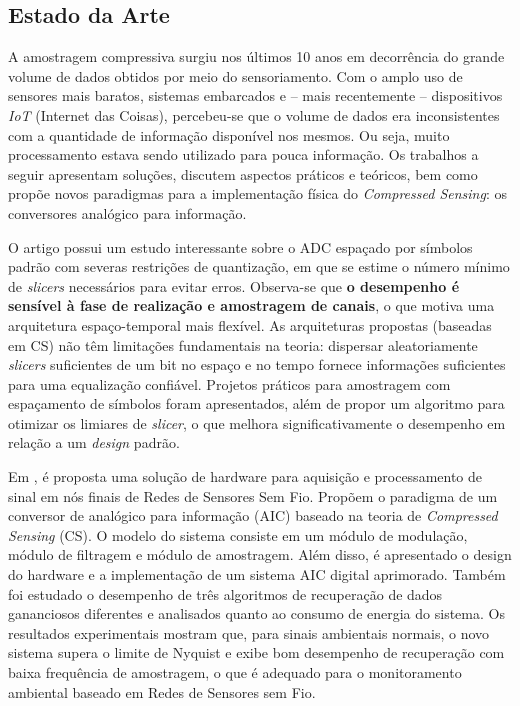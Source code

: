 \documentclass[a4paper, 12pt]{article}
\begin{document}
\subsection{Estado da Arte}

A amostragem compressiva surgiu nos últimos 10 anos em decorrência do grande volume de dados obtidos por meio do sensoriamento. Com o amplo uso de sensores mais baratos, sistemas embarcados e -- mais recentemente -- dispositivos \textit{IoT} (Internet das Coisas), percebeu-se que o volume de dados era inconsistentes com a quantidade de informação disponível nos mesmos. Ou seja, muito processamento estava sendo utilizado para pouca informação. Os trabalhos a seguir apresentam soluções, discutem aspectos práticos e teóricos, bem como propõe novos paradigmas para a implementação física do \textit{Compressed Sensing}: os conversores analógico para informação.

O artigo \cite{wadhwa2016slicer} possui um estudo interessante sobre o ADC espaçado por símbolos padrão com severas restrições de quantização, em que se estime o número mínimo de \textit{slicers} necessários para evitar erros. Observa-se que \textbf{o desempenho é sensível à fase de realização e amostragem de canais}, o que motiva uma arquitetura espaço-temporal mais flexível. As arquiteturas propostas (baseadas em CS) não têm limitações fundamentais na teoria: dispersar aleatoriamente \textit{slicers} suficientes de um bit no espaço e no tempo fornece informações suficientes para uma equalização confiável. Projetos práticos para amostragem com espaçamento de símbolos foram apresentados, além de propor um algoritmo para otimizar os limiares de \textit{slicer}, o que melhora significativamente o desempenho em relação a um \textit{design} padrão.

Em \cite{shen2017design}, é proposta uma solução de hardware para aquisição e processamento de sinal em nós finais de Redes de Sensores Sem Fio. Propõem o paradigma de um conversor de analógico para informação (AIC) baseado na teoria de \textit{Compressed Sensing} (CS). O modelo do sistema consiste em um módulo de modulação, módulo de filtragem e módulo de amostragem. Além disso, é apresentado o design do hardware e a implementação de um sistema AIC digital aprimorado. Também foi estudado o desempenho de três algoritmos de recuperação de dados gananciosos diferentes e analisados quanto ao consumo de energia do sistema. Os resultados experimentais mostram que, para sinais ambientais normais, o novo sistema supera o limite de Nyquist e exibe bom desempenho de recuperação com baixa frequência de amostragem, o que é adequado para o monitoramento ambiental baseado em Redes de Sensores sem Fio.
\end{document}
